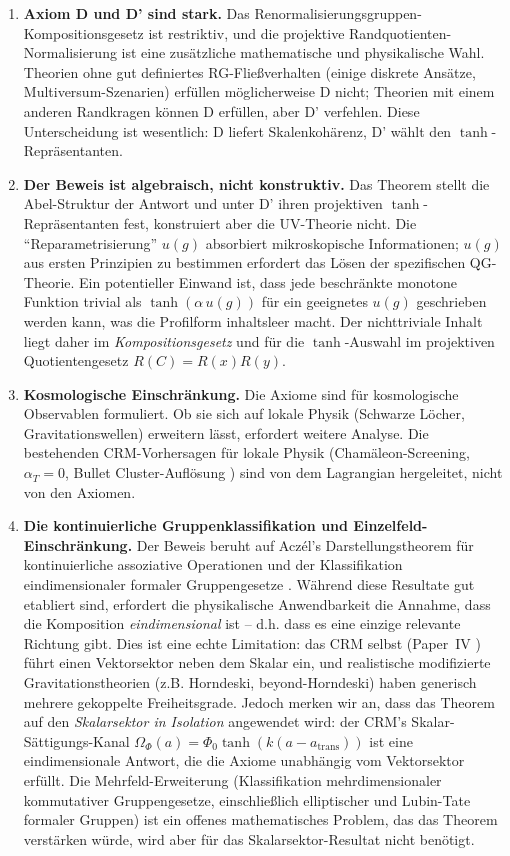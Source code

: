 \documentclass[aps,prd,twocolumn,superscriptaddress,nofootinbib]{revtex4-2}
\begin{document}
\begin{enumerate}
\item \textbf{Axiom D und D' sind stark.} Das Renormalisierungsgruppen-Kompositionsgesetz ist restriktiv, und die projektive Randquotienten-Normalisierung ist eine zusätzliche mathematische und physikalische Wahl. Theorien ohne gut definiertes RG-Fließverhalten (einige diskrete Ansätze, Multiversum-Szenarien) erfüllen möglicherweise D nicht; Theorien mit einem anderen Randkragen können D erfüllen, aber D' verfehlen. Diese Unterscheidung ist wesentlich: D liefert Skalenkohärenz, D' wählt den $\tanh$-Repräsentanten.

\item \textbf{Der Beweis ist algebraisch, nicht konstruktiv.} Das Theorem stellt die Abel-Struktur der Antwort und unter D' ihren projektiven $\tanh$-Repräsentanten fest, konstruiert aber die UV-Theorie nicht. Die ``Reparametrisierung'' $u(g)$ absorbiert mikroskopische Informationen; $u(g)$ aus ersten Prinzipien zu bestimmen erfordert das Lösen der spezifischen QG-Theorie. Ein potentieller Einwand ist, dass jede beschränkte monotone Funktion trivial als $\tanh(\alpha\,u(g))$ für ein geeignetes $u(g)$ geschrieben werden kann, was die Profilform inhaltsleer macht. Der nichttriviale Inhalt liegt daher im \textit{Kompositionsgesetz} und für die $\tanh$-Auswahl im projektiven Quotientengesetz $R(C)=R(x)R(y)$.

\item \textbf{Kosmologische Einschränkung.} Die Axiome sind für kosmologische Observablen formuliert. Ob sie sich auf lokale Physik (Schwarze Löcher, Gravitationswellen) erweitern lässt, erfordert weitere Analyse. Die bestehenden CRM-Vorhersagen für lokale Physik (Chamäleon-Screening, $\alpha_T = 0$, Bullet Cluster-Auflösung \cite{Geiger2026b,Geiger2026c,Geiger2026d}) sind von dem Lagrangian hergeleitet, nicht von den Axiomen.

\item \textbf{Die kontinuierliche Gruppenklassifikation und Einzelfeld-Einschränkung.} Der Beweis beruht auf Aczél's Darstellungstheorem für kontinuierliche assoziative Operationen \cite{Aczel1966} und der Klassifikation eindimensionaler formaler Gruppengesetze \cite{Hazewinkel1978}. Während diese Resultate gut etabliert sind, erfordert die physikalische Anwendbarkeit die Annahme, dass die Komposition \textit{eindimensional} ist -- d.h. dass es eine einzige relevante Richtung gibt. Dies ist eine echte Limitation: das CRM selbst (Paper~IV \cite{Geiger2026d}) führt einen Vektorsektor neben dem Skalar ein, und realistische modifizierte Gravitationstheorien (z.B. Horndeski, beyond-Horndeski) haben generisch mehrere gekoppelte Freiheitsgrade. Jedoch merken wir an, dass das Theorem auf den \textit{Skalarsektor in Isolation} angewendet wird: der CRM's Skalar-Sättigungs-Kanal $\Omega_\Phi(a) = \Phi_0 \tanh(k(a - a_{\mathrm{trans}}))$ ist eine eindimensionale Antwort, die die Axiome unabhängig vom Vektorsektor erfüllt. Die Mehrfeld-Erweiterung (Klassifikation mehrdimensionaler kommutativer Gruppengesetze, einschließlich elliptischer und Lubin-Tate formaler Gruppen) ist ein offenes mathematisches Problem, das das Theorem verstärken würde, wird aber für das Skalarsektor-Resultat nicht benötigt.


\end{enumerate}
\end{document}
